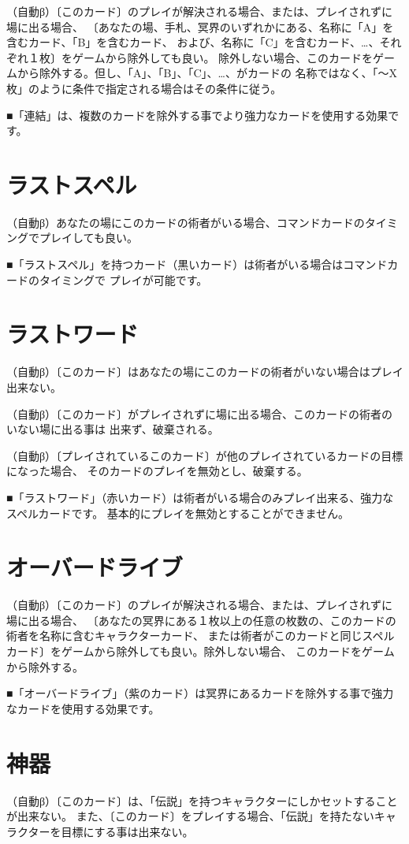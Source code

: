 \documentclass[fontsize=9pt,twocolumn,hanging_punctuation]{jlreq}
\begin{document}
（自動β）〔このカード〕のプレイが解決される場合、または、プレイされずに場に出る場合、
〔あなたの場、手札、冥界のいずれかにある、名称に「A」を含むカード、「B」を含むカード、
および、名称に「C」を含むカード、…、それぞれ１枚〕をゲームから除外しても良い。
除外しない場合、このカードをゲームから除外する。但し、「A」、「B」、「C」、…、がカードの
名称ではなく、「～X 枚」のように条件で指定される場合はその条件に従う。

■「連結」は、複数のカードを除外する事でより強力なカードを使用する効果です。

\section*{ラストスペル}
（自動β）あなたの場にこのカードの術者がいる場合、コマンドカードのタイミングでプレイしても良い。

■「ラストスペル」を持つカード（黒いカード）は術者がいる場合はコマンドカードのタイミングで
プレイが可能です。

\section*{ラストワード}
（自動β）〔このカード〕はあなたの場にこのカードの術者がいない場合はプレイ出来ない。

（自動β）〔このカード〕がプレイされずに場に出る場合、このカードの術者のいない場に出る事は
出来ず、破棄される。

（自動β）〔プレイされているこのカード〕が他のプレイされているカードの目標になった場合、
そのカードのプレイを無効とし、破棄する。

■「ラストワード」（赤いカード）は術者がいる場合のみプレイ出来る、強力なスペルカードです。
基本的にプレイを無効とすることができません。

\section*{オーバードライブ}
（自動β）〔このカード〕のプレイが解決される場合、または、プレイされずに場に出る場合、
〔あなたの冥界にある１枚以上の任意の枚数の、このカードの術者を名称に含むキャラクターカード、
または術者がこのカードと同じスペルカード〕をゲームから除外しても良い。除外しない場合、
このカードをゲームから除外する。

■「オーバードライブ」（紫のカード）は冥界にあるカードを除外する事で強力なカードを使用する効果です。

\pagebreak
\section*{神器}
（自動β）〔このカード〕は、「伝説」を持つキャラクターにしかセットすることが出来ない。
また、〔このカード〕をプレイする場合、「伝説」を持たないキャラクターを目標にする事は出来ない。
\end{document}
